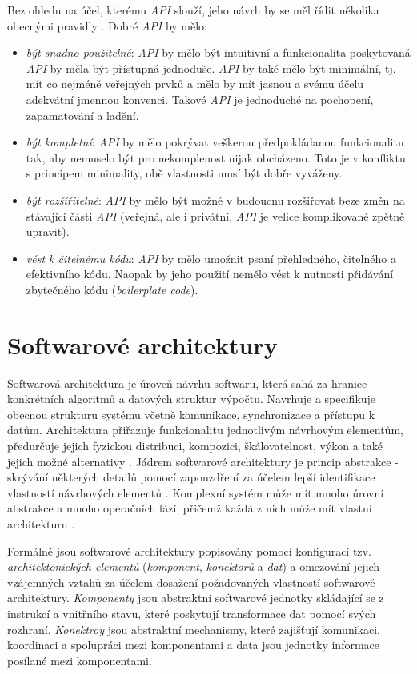 Bez ohledu na účel, kterému \textit{API} slouží, jeho návrh by se měl řídit několika obecnými pravidly \cite{Bloch06}. Dobré \textit{API} by mělo:
\begin{itemize}
  \item{\textit{být snadno použitelné}}: \textit{API} by mělo být intuitivní a funkcionalita poskytovaná \textit{API} by měla být přístupná jednoduše. \textit{API} by také mělo být minimální, tj. mít co nejméně veřejných prvků a mělo by mít jasnou a svému účelu adekvátní jmennou konvenci. Takové \textit{API} je jednoduché na pochopení, zapamatování a ladění.
  \item{\textit{být kompletní}}: \textit{API} by mělo pokrývat veškerou předpokládanou funkcionalitu tak, aby nemuselo být pro nekomplenost nijak obcházeno. Toto je v konfliktu s principem minimality, obě vlastnosti musí být dobře vyváženy.
  \item{\textit{být rozšířitelné}}: \textit{API} by mělo být možné v budoucnu rozšiřovat beze změn na stávající části \textit{API} (veřejná, ale i privátní, \textit{API} je velice komplikované zpětně upravit).
  \item{\textit{vést k čitelnému kódu}}: \textit{API} by mělo umožnit psaní přehledného, čitelného a efektivního kódu. Naopak by jeho použití nemělo vést k nutnosti přidávání zbytečného kódu (\textit{boilerplate code}).
\end{itemize}

\section{Softwarové architektury}
\label{sec:architectures}
Softwarová architektura je úroveň návrhu softwaru, která sahá za hranice konkrétních algoritmů a datových struktur výpočtu. Navrhuje a specifikuje obecnou strukturu systému včetně komunikace,
synchronizace a přístupu k datům. Architektura přiřazuje funkcionalitu jednotlivým návrhovým elementům, předurčuje jejich fyzickou distribuci, kompozici, škálovatelnost, výkon a také jejich možné alternativy \cite{Garlan94}. Jádrem softwarové architektury je princip abstrakce - skrývání některých detailů pomocí zapouzdření za účelem lepší identifikace vlastností návrhových elementů \cite{Shaw90}. Komplexní systém může mít mnoho úrovní abstrakce a mnoho operačních fází, přičemž každá z nich může mít vlastní architekturu \cite{Bass98}.

Formálně jsou softwarové architektury popisovány pomocí konfigurací tzv. \textit{architektonických elementů} (\textit{komponent}, \textit{konektorů} a \textit{dat}) a omezování jejich vzájemných vztahů za účelem dosažení požadovaných vlastností softwarové architektury. \textit{Komponenty} jsou abstraktní softwarové jednotky skládající se z instrukcí a vnitřního stavu, které poskytují transformace dat pomocí svých rozhraní. \textit{Konektroy} jsou abstraktní mechanismy, které zajišťují komunikaci, koordinaci a spolupráci mezi komponentami a data jsou jednotky informace posílané mezi komponentami. \cite{Shaw97}

